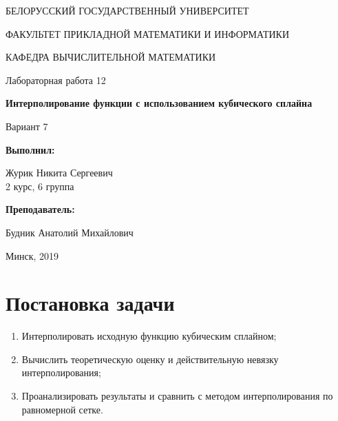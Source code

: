 \documentclass[14pt, a4paper]{article}
\begin{document}
\begin{titlepage}
\begin{center}
\large{БЕЛОРУССКИЙ ГОСУДАРСТВЕННЫЙ УНИВЕРСИТЕТ 

ФАКУЛЬТЕТ ПРИКЛАДНОЙ МАТЕМАТИКИ И ИНФОРМАТИКИ

КАФЕДРА ВЫЧИСЛИТЕЛЬНОЙ МАТЕМАТИКИ}
\end{center}
\vspace*{\fill}
\begin{center}
Лабораторная работа 12

\large{\textbf{Интерполирование функции с использованием кубического сплайна}}

Вариант 7
\end{center}
\begin{flushright}
\textbf{Выполнил:}

Журик Никита Сергеевич \\ 2 курс, 6 группа

\textbf{Преподаватель:}

Будник Анатолий Михайлович
\end{flushright}
\vspace*{\fill}
\begin{center}
Минск, 2019
\end{center}
\end{titlepage}

\tableofcontents
\newpage

\newpage
{}

  \section{Постановка задачи}
    \begin{enumerate}
      \item
      Интерполировать исходную функцию кубическим сплайном;
      \item
      Вычислить теоретическую оценку и действительную невязку интерполирования;
      \item
      Проанализировать результаты и сравнить с методом интерполирования по равномерной сетке.
    \end{enumerate}
\end{document}
